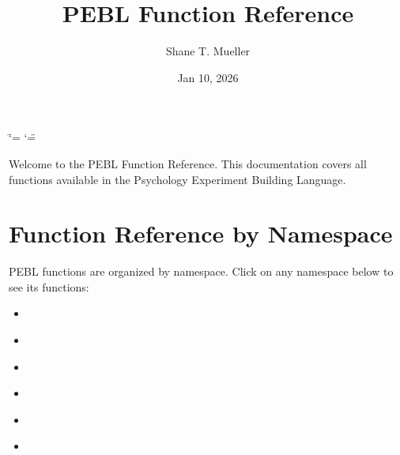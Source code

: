 \documentclass[letterpaper,10pt,english]{sphinxmanual}
\title{PEBL Function Reference}
\date{Jan 10, 2026}
\author{Shane T. Mueller}
\begin{document}
\ifdefined\shorthandoff
  \ifnum\catcode`\=\string=\active\shorthandoff{=}\fi
  \ifnum\catcode`\"=\active{}\fi
\fi

\pagestyle{empty}
\sphinxmaketitle
\pagestyle{plain}
\sphinxtableofcontents
\pagestyle{normal}
\label{\detokenize{index::doc}}


\sphinxAtStartPar
Welcome to the PEBL Function Reference. This documentation covers all functions available in the Psychology Experiment Building Language.


\chapter{Function Reference by Namespace}
\label{\detokenize{index:function-reference-by-namespace}}
\sphinxAtStartPar
PEBL functions are organized by namespace. Click on any namespace below to see its functions:

\sphinxAtStartPar
{}
\begin{itemize}
\item {} 
\sphinxAtStartPar
{\hyperref[\detokenize{reference/peblenvironment::doc}]{}}

\item {} 
\sphinxAtStartPar
{\hyperref[\detokenize{reference/pebllist::doc}]{}}

\item {} 
\sphinxAtStartPar
{\hyperref[\detokenize{reference/peblmath::doc}]{}}

\item {} 
\sphinxAtStartPar
{\hyperref[\detokenize{reference/peblobjects::doc}]{}}

\item {} 
\sphinxAtStartPar
{\hyperref[\detokenize{reference/peblstream::doc}]{}}

\item {} 
\sphinxAtStartPar
{\hyperref[\detokenize{reference/peblstring::doc}]{}}

\end{itemize}
\end{document}

